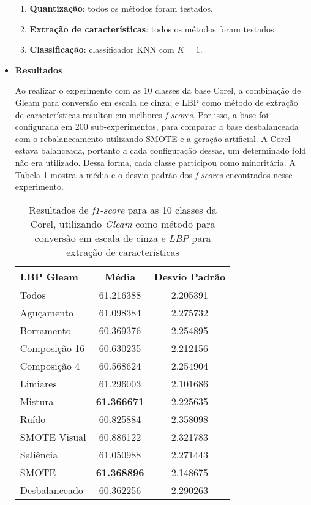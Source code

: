 \begin{itemize}
\begin{enumerate}
\item \textbf{Quantização}: todos os métodos foram testados.
\item \textbf{Extração de características}: todos os métodos foram testados.
\item \textbf{Classificação}: classificador KNN com $K=1$.
\end{enumerate}

\item[] \textbf{Resultados}

Ao realizar o experimento com as 10 classes da base Corel, a combinação de Gleam para conversão em escala de cinza; e LBP como método de extração de características resultou em melhores \textit{f-scores}. Por isso, a base foi configurada em 200 sub-experimentos, para comparar a base desbalanceada com o rebalanceamento utilizando SMOTE e a geração artificial. A Corel estava balanceada, portanto a cada configuração dessas, um determinado fold não era utilizado. Dessa forma, cada classe participou como minoritária. A Tabela \ref{tab:resultados:3.1} mostra a média e o desvio padrão dos \textit{f-scores} encontrados nesse experimento.

\begin{minipage}{\linewidth}
\begin{table}[H]
\begin{center}
\caption{Resultados de \textit{f1-score} para as 10 classes da Corel, utilizando \emph{Gleam} como método para conversão em escala de cinza e \emph{LBP} para extração de características}
\label{tab:resultados:3.1}
\begin{tabular}{|l|c|c|}
\hline
\textbf{LBP Gleam} & \textbf{Média}     & \textbf{Desvio Padrão} \\ \hline
   Todos        &  61.216388 &  2.205391  \\ \hline
  Aguçamento    &  61.098384 &  2.275732  \\ \hline
  Borramento    &  60.369376 &  2.254895  \\ \hline
  Composição 16 &  60.630235 &  2.212156  \\ \hline
  Composição 4  &  60.568624 &  2.254904  \\ \hline
  Limiares      &  61.296003 &  2.101686  \\ \hline
  Mistura       &  \textbf{61.366671} &  2.225635  \\ \hline
  Ruído         &  60.825884 &  2.358098  \\ \hline
  SMOTE Visual  &  60.886122 &  2.321783  \\ \hline
  Saliência     &  61.050988 &  2.271443  \\ \hline
 SMOTE          &  \textbf{61.368896} &  2.148675  \\ \hline
Desbalanceado   &  60.362256 &  2.290263  \\ \hline
\end{tabular}
\end{center}
\end{table}
\end{minipage}


\end{itemize}
